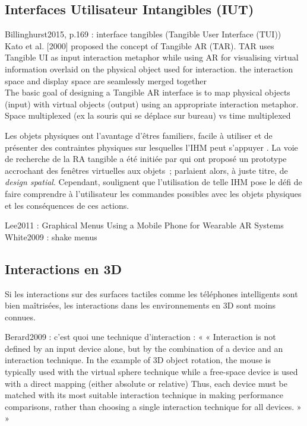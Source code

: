 \subsection{Interfaces Utilisateur Intangibles (IUT)}
Billinghurst2015, p.169 : interface tangibles (Tangible User Interface (TUI))\\
Kato et al. [2000] proposed the concept of Tangible AR (TAR). TAR uses Tangible UI as input interaction metaphor while using AR for visualising virtual information overlaid on the physical object used for interaction. the interaction space and display space are seamlessly merged together\\
The basic goal of designing a Tangible AR interface is to map physical objects (input) with virtual objects (output) using an appropriate interaction metaphor.\\
Space multiplexed (ex la souris qui se déplace sur bureau) vs time multiplexed

Les objets physiques ont l'avantage d'êtres familiers, facile à utiliser et de présenter des contraintes physiques sur lesquelles l'IHM peut s'appuyer \citep{ZhouDuhBillinghurst2008}. La voie de recherche de la RA tangible a été initiée par \cite{FeinerMacIntyreHauptEtAl1993} qui ont proposé un prototype accrochant des fenêtres virtuelles aux objets~; \citeauthor{FeinerMacIntyreHauptEtAl1993} parlaient alors, à juste titre, de \emph{design spatial}. Cependant, \citeauthor{ZhouDuhBillinghurst2008} soulignent que l'utilisation de telle IHM pose le défi de faire comprendre à l'utilisateur les commandes possibles avec les objets physiques et les conséquences de ces actions.

Lee2011 : Graphical Menus Using a Mobile Phone for Wearable AR Systems\\
White2009 : shake menus

\subsection{Interactions en 3D}
Si les interactions sur des surfaces tactiles comme les téléphones intelligents sont bien maîtrisées, les interactions dans les environnements en 3D sont moins connues.

Berard2009 : c'est quoi une technique d'interaction : « « Interaction is not defined by an input device alone, but by the combination of a device and an interaction technique. In the example of 3D object rotation, the mouse is typically used with the virtual sphere technique while a free-space device is used with a direct mapping (either absolute or relative) Thus, each device must be matched with its most suitable interaction technique in making performance comparisons, rather than choosing a single interaction technique for all devices. » »

